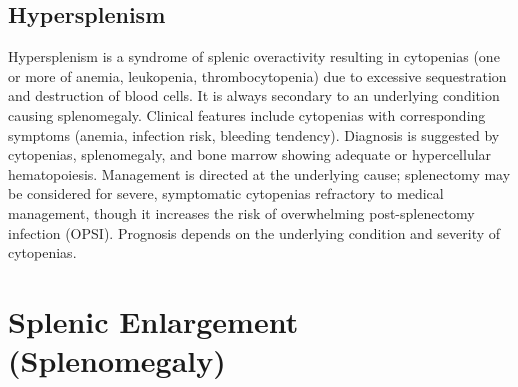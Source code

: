 \subsection{Hypersplenism}
\label{sec:Hypersplenism}
Hypersplenism is a syndrome of splenic overactivity resulting in cytopenias (one or more of anemia, leukopenia, thrombocytopenia) due to excessive sequestration and destruction of blood cells. It is always secondary to an underlying condition causing splenomegaly. Clinical features include cytopenias with corresponding symptoms (anemia, infection risk, bleeding tendency). Diagnosis is suggested by cytopenias, splenomegaly, and bone marrow showing adequate or hypercellular hematopoiesis. Management is directed at the underlying cause; splenectomy may be considered for severe, symptomatic cytopenias refractory to medical management, though it increases the risk of overwhelming post-splenectomy infection (OPSI). Prognosis depends on the underlying condition and severity of cytopenias.

\section{Splenic Enlargement (Splenomegaly)}








\label{sec:Splenic Enlargement (Splenomegaly)}

